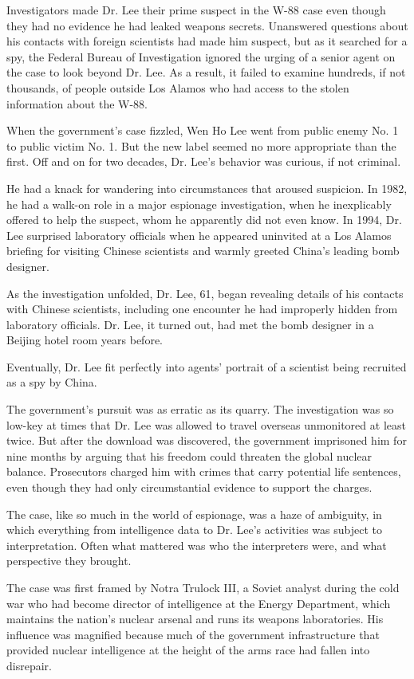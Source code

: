 Investigators made Dr. Lee their prime suspect in the W-88 case even
though they had no evidence he had leaked weapons secrets. Unanswered
questions about his contacts with foreign scientists had made him
suspect, but as it searched for a spy, the Federal Bureau of
Investigation ignored the urging of a senior agent on the case to look
beyond Dr. Lee. As a result, it failed to examine hundreds, if not
thousands, of people outside Los Alamos who had access to the stolen
information about the W-88.

When the government's case fizzled, Wen Ho Lee went from public enemy
No. 1 to public victim No. 1. But the new label seemed no more
appropriate than the first. Off and on for two decades, Dr. Lee's
behavior was curious, if not criminal.

He had a knack for wandering into circumstances that aroused suspicion.
In 1982, he had a walk-on role in a major espionage investigation, when
he inexplicably offered to help the suspect, whom he apparently did not
even know. In 1994, Dr. Lee surprised laboratory officials when he
appeared uninvited at a Los Alamos briefing for visiting Chinese
scientists and warmly greeted China's leading bomb designer.

As the investigation unfolded, Dr. Lee, 61, began revealing details of
his contacts with Chinese scientists, including one encounter he had
improperly hidden from laboratory officials. Dr. Lee, it turned out, had
met the bomb designer in a Beijing hotel room years before.

Eventually, Dr. Lee fit perfectly into agents' portrait of a scientist
being recruited as a spy by China.

The government's pursuit was as erratic as its quarry. The investigation
was so low-key at times that Dr. Lee was allowed to travel overseas
unmonitored at least twice. But after the download was discovered, the
government imprisoned him for nine months by arguing that his freedom
could threaten the global nuclear balance. Prosecutors charged him with
crimes that carry potential life sentences, even though they had only
circumstantial evidence to support the charges.

The case, like so much in the world of espionage, was a haze of
ambiguity, in which everything from intelligence data to Dr. Lee's
activities was subject to interpretation. Often what mattered was who
the interpreters were, and what perspective they brought.

The case was first framed by Notra Trulock III, a Soviet analyst during
the cold war who had become director of intelligence at the Energy
Department, which maintains the nation's nuclear arsenal and runs its
weapons laboratories. His influence was magnified because much of the
government infrastructure that provided nuclear intelligence at the
height of the arms race had fallen into disrepair.

